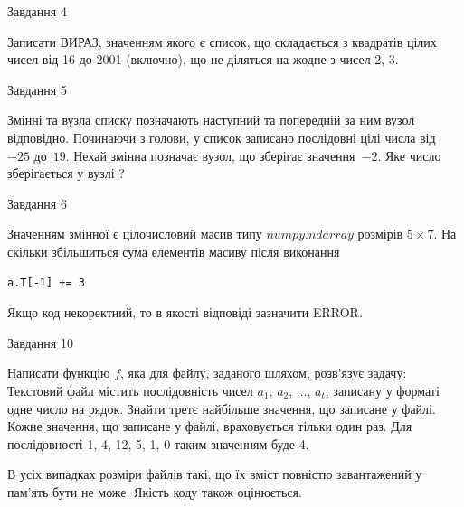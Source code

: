 \documentclass[12pt, ukrainian]{article}
\begin{document}
{               
{\begin{center}Завдання {4}\end{center}}
\vspace{-6mm}

Записати ВИРАЗ, значенням якого є список, що складається з квадратів цілих чисел від 16 до 2001 (включно), що не діляться на жодне з чисел 2, 3.\par

\vspace{10mm}
               
{\begin{center}Завдання {5}\end{center}}
\vspace{-6mm}
Змінні  та  вузла списку позначають наступний та попередній за ним вузол відповідно. Починаючи з голови, у список записано послідовні цілі числа від~$-25$ до~$19$. Нехай змінна  позначає вузол, що зберігає значення~$-2$.
Яке число зберігається у вузлі  ?\par

               
{\begin{center}Завдання {6}\end{center}}
\vspace{-6mm}
Значенням змінної  є цілочисловий масив типу $numpy.ndarray$ розмірів $5{\times}7$. На скільки збільшиться сума елементів масиву  після виконання
\begin{verbatim}
a.T[-1] += 3
\end{verbatim}


Якщо код некоректний, то в якості відповіді зазначити ERROR.\par

               
{\begin{center}Завдання {10}\end{center}}
\vspace{-6mm}

Написати функцію $f$, яка для файлу, заданого шляхом, розв’язує задачу:\\ Текстовий файл містить послідовність чисел $a_1$, $a_2$, $\ldots$, $a_t$, записану у форматі одне число на рядок. Знайти третє найбільше значення, що записане у файлі. Кожне значення, що записане у файлі, враховується тільки один раз. Для послідовності 1, 4, 12, 5, 1, 0 таким значенням буде 4.

В усіх випадках розміри файлів такі, що їх вміст повністю завантажений у пам'ять бути не може. Якість коду також оцінюється.



}
\end{document}
